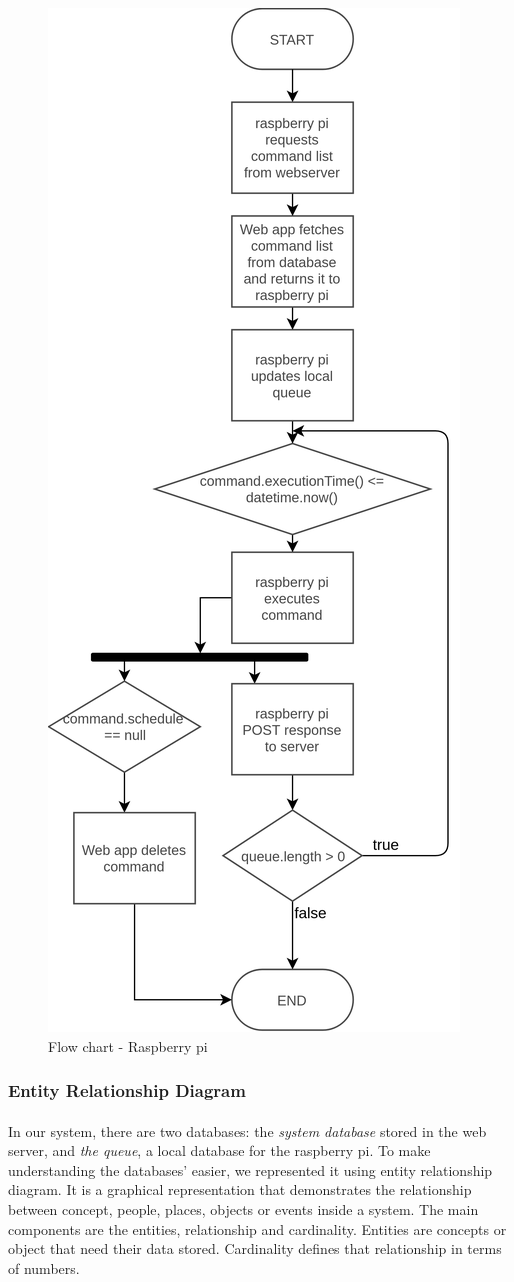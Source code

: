 \documentclass[12pt, oneside, a4paper]{book}
\begin{document}
				\begin{figure}[H]
					\centering
					\includegraphics[width=.65\linewidth]{img/flowchart_raspberry.png}
					\caption{Flow chart - Raspberry pi}
					\label{fig:ig:flow_rasp}
				\end{figure}
				\newpage\subsubsection{Entity Relationship Diagram}
					\paragraph{} In our system, there are two databases: the \textit{system database} stored in the web server, and \textit{the queue}, a local database for the raspberry pi. To make understanding the databases' easier, we represented it using entity relationship diagram. It is a graphical representation that demonstrates the relationship between concept, people, places, objects or events inside a system. The main components are the entities, relationship and cardinality. Entities are concepts or object that need their data stored. Cardinality defines that relationship in terms of numbers\cite{erd}.
				
\end{document}
